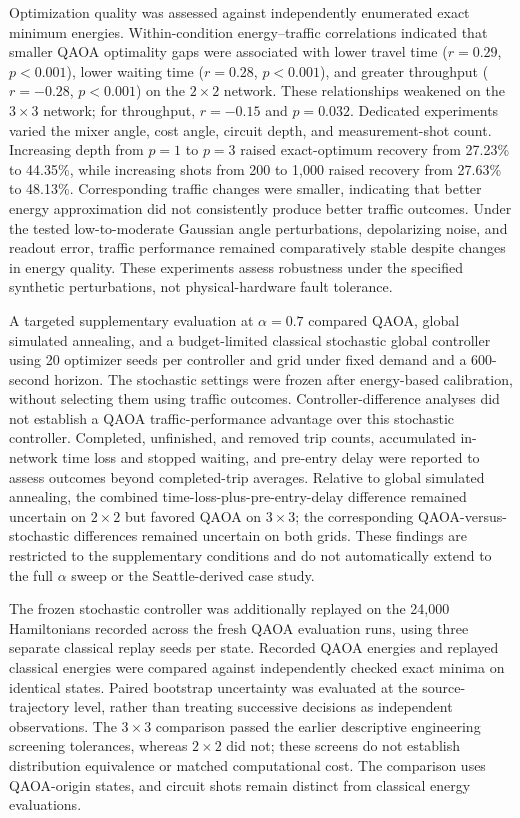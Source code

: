 Optimization quality was assessed against independently enumerated exact minimum energies. Within-condition energy--traffic correlations indicated that smaller QAOA optimality gaps were associated with lower travel time ($r=0.29$, $p<0.001$), lower waiting time ($r=0.28$, $p<0.001$), and greater throughput ($r=-0.28$, $p<0.001$) on the $2\times2$ network. These relationships weakened on the $3\times3$ network; for throughput, $r=-0.15$ and $p=0.032$. Dedicated experiments varied the mixer angle, cost angle, circuit depth, and measurement-shot count. Increasing depth from $p=1$ to $p=3$ raised exact-optimum recovery from 27.23\% to 44.35\%, while increasing shots from 200 to 1,000 raised recovery from 27.63\% to 48.13\%. Corresponding traffic changes were smaller, indicating that better energy approximation did not consistently produce better traffic outcomes. Under the tested low-to-moderate Gaussian angle perturbations, depolarizing noise, and readout error, traffic performance remained comparatively stable despite changes in energy quality. These experiments assess robustness under the specified synthetic perturbations, not physical-hardware fault tolerance.

A targeted supplementary evaluation at $\alpha=0.7$ compared QAOA, global simulated annealing, and a budget-limited classical stochastic global controller using 20 optimizer seeds per controller and grid under fixed demand and a 600-second horizon. The stochastic settings were frozen after energy-based calibration, without selecting them using traffic outcomes. Controller-difference analyses did not establish a QAOA traffic-performance advantage over this stochastic controller. Completed, unfinished, and removed trip counts, accumulated in-network time loss and stopped waiting, and pre-entry delay were reported to assess outcomes beyond completed-trip averages. Relative to global simulated annealing, the combined time-loss-plus-pre-entry-delay difference remained uncertain on $2\times2$ but favored QAOA on $3\times3$; the corresponding QAOA-versus-stochastic differences remained uncertain on both grids. These findings are restricted to the supplementary conditions and do not automatically extend to the full $\alpha$ sweep or the Seattle-derived case study.

The frozen stochastic controller was additionally replayed on the 24,000 Hamiltonians recorded across the fresh QAOA evaluation runs, using three separate classical replay seeds per state. Recorded QAOA energies and replayed classical energies were compared against independently checked exact minima on identical states. Paired bootstrap uncertainty was evaluated at the source-trajectory level, rather than treating successive decisions as independent observations. The $3\times3$ comparison passed the earlier descriptive engineering screening tolerances, whereas $2\times2$ did not; these screens do not establish distribution equivalence or matched computational cost. The comparison uses QAOA-origin states, and circuit shots remain distinct from classical energy evaluations.

